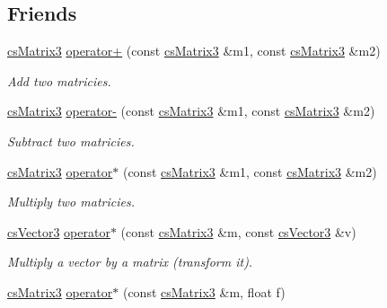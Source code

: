 \subsection*{Friends}
\begin{DoxyCompactItemize}
\item 
\hyperlink{classcsMatrix3}{cs\+Matrix3} \hyperlink{classcsMatrix3_a1812f4c5f495c0f8693d4b8ddab90b8d}{operator+} (const \hyperlink{classcsMatrix3}{cs\+Matrix3} \&m1, const \hyperlink{classcsMatrix3}{cs\+Matrix3} \&m2)\hypertarget{classcsMatrix3_a1812f4c5f495c0f8693d4b8ddab90b8d}{}\label{classcsMatrix3_a1812f4c5f495c0f8693d4b8ddab90b8d}

\begin{DoxyCompactList}\small\item\em Add two matricies. \end{DoxyCompactList}\item 
\hyperlink{classcsMatrix3}{cs\+Matrix3} \hyperlink{classcsMatrix3_a114173e10da80d8f3d27331e529a7d58}{operator-\/} (const \hyperlink{classcsMatrix3}{cs\+Matrix3} \&m1, const \hyperlink{classcsMatrix3}{cs\+Matrix3} \&m2)\hypertarget{classcsMatrix3_a114173e10da80d8f3d27331e529a7d58}{}\label{classcsMatrix3_a114173e10da80d8f3d27331e529a7d58}

\begin{DoxyCompactList}\small\item\em Subtract two matricies. \end{DoxyCompactList}\item 
\hyperlink{classcsMatrix3}{cs\+Matrix3} \hyperlink{classcsMatrix3_a2142d94bca5ade10e0d34412463823df}{operator$\ast$} (const \hyperlink{classcsMatrix3}{cs\+Matrix3} \&m1, const \hyperlink{classcsMatrix3}{cs\+Matrix3} \&m2)\hypertarget{classcsMatrix3_a2142d94bca5ade10e0d34412463823df}{}\label{classcsMatrix3_a2142d94bca5ade10e0d34412463823df}

\begin{DoxyCompactList}\small\item\em Multiply two matricies. \end{DoxyCompactList}\item 
\hyperlink{classcsVector3}{cs\+Vector3} \hyperlink{classcsMatrix3_afb3f3ef060c7436538f17901ce41a410}{operator$\ast$} (const \hyperlink{classcsMatrix3}{cs\+Matrix3} \&m, const \hyperlink{classcsVector3}{cs\+Vector3} \&v)\hypertarget{classcsMatrix3_afb3f3ef060c7436538f17901ce41a410}{}\label{classcsMatrix3_afb3f3ef060c7436538f17901ce41a410}

\begin{DoxyCompactList}\small\item\em Multiply a vector by a matrix (transform it). \end{DoxyCompactList}\item 
\hyperlink{classcsMatrix3}{cs\+Matrix3} \hyperlink{classcsMatrix3_a7a540bf654d2ebcf0464fd5fdcaaae7c}{operator$\ast$} (const \hyperlink{classcsMatrix3}{cs\+Matrix3} \&m, float f)\hypertarget{classcsMatrix3_a7a540bf654d2ebcf0464fd5fdcaaae7c}{}\label{classcsMatrix3_a7a540bf654d2ebcf0464fd5fdcaaae7c}


\end{DoxyCompactItemize}
